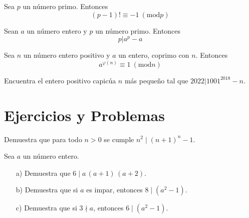 \begin{ejercicio}
Sea $p$ un número primo. Entonces $$(p-1)!\equiv -1~(\mathrm {mod} p)$$
\end{ejercicio}

\begin{ejercicio}
Sean $a$ un número entero y $p$ un número primo. Entonces $$p|a^p-a$$
\end{ejercicio}

\begin{ejercicio}
Sea $n$ un número entero positivo y $a$ un entero, coprimo con $n$. Entonces $$a^{\varphi (n)}\equiv 1~(\mathrm {mod} n)$$
\end{ejercicio}

\begin{ejercicio}
Encuentra el entero positivo capicúa $n$ más pequeño tal que $2022|1001^{2018}-n$.
\end{ejercicio}
\newpage

\section{Ejercicios y Problemas}


\begin{ejercicio}
  Demuestra que para todo $n > 0$ se cumple $n^2 \mid (n+1)^n - 1$.
\end{ejercicio}

\begin{ejercicio}
  Sea $a$ un número entero.

  \begin{enumerate}
  \item[a)] Demuestra que $6 \mid a\,(a+1)\,(a+2)$.

  \item[b)] Demuestra que si $a$ es impar, entonces $8 \mid (a^2 - 1)$.

  \item[c)] Demuestra que si $3\nmid a$, entonces $6 \mid (a^2 - 1)$.
  \end{enumerate}
\end{ejercicio}

